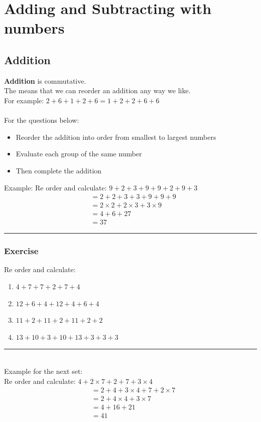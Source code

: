 \documentclass[a4paper,12pt]{article}
\newcommand\question{
	 \rule[0pt]{17cm}{0.5pt}\vspace{-0.5cm}
	\subsubsection{Exercise}

}
\newcommand\questionend{
	\rule[0pt]{17cm}{0.5pt}\vspace{0.0cm}\\
}
\begin{document}
\section{Adding and Subtracting with numbers}
\subsection{Addition}
\textbf{Addition} is commutative.\\
The means that we can reorder an addition any way we like.\\
For example: $2+6+1+2+6 =  1 +2+2+6+6$\\\\
For the questions below: 
\begin{itemize}
	\item Reorder the addition into order from smallest to largest numbers
	\item Evaluate each group of the same number
	\item Then complete the addition
\end{itemize}
Example: Re order and calculate: $9+2+3+9+9+2+9+3$
\begin{align*}
	&=  2 + 2 + 3+3 +9+9+9\\
	&=  2 \times 2 + 2 \times 3 + 3 \times 9 \\
	&= 4 + 6 +27\\
	& = 37
\end{align*}
\question
Re order and calculate:
\begin{multicols}{2}
	\begin{enumerate}[label=\normalsize \alph*)~~~ , topsep=8pt,itemsep=5pt,partopsep=4pt, parsep=4pt]
		\item $4+7+7+2+7+4$
		\item $12 + 6 + 4 + 12 +4 +6 +4$
		\item $11 +2+ 11 +2 + 11 +2 +2$
		\item $13 + 10 +  3 + 10 + 13 + 3+ 3 +3$
	\end{enumerate}
\end{multicols}\vspace{0.2cm}
\questionend
Example for the next set:\\
Re order and calculate: $4+2 \times 7+2+7+3 \times 4$
\begin{align*}
	&=  2 + 4  +3 \times 4 + 7 + 2 \times 7 \\
	&=  2 + 4 \times 4 + 3 \times 7 \\
	&= 4 + 16 +21\\
	& = 41
\end{align*}
\end{document}
